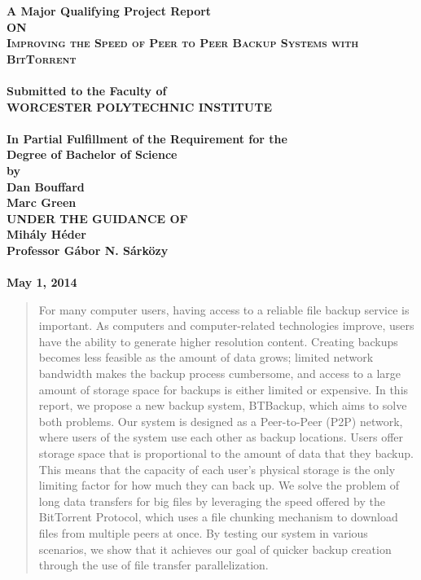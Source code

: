 \documentclass[12pt]{report}
\begin{document}
\begin{titlepage}
\begin{center}
\thispagestyle{empty}
\Large{\textbf{A Major Qualifying Project Report\\ \large{ON}}}\\[1.75cm]
\LARGE{\textsc {\textbf{Improving the Speed of Peer to Peer Backup Systems with BitTorrent}}}\\[0.5cm]
\vspace{0.25cm}
\Large{\textbf{\\Submitted to the Faculty of }}
\LARGE{\textbf{\\WORCESTER POLYTECHNIC INSTITUTE\\}}
\vspace{0.5cm}
\Large{\textbf{\\In Partial Fulfillment of the Requirement for the}}
\Large{\textbf{\\Degree of Bachelor of Science}}
\vspace{0.5cm}
\Large{\textbf{\\by}}\\[0.75cm]
\large{\textbf{Dan Bouffard}}\\
\large{\textbf{Marc Green}}\\
\vspace{1cm}
\large{\textbf{UNDER THE GUIDANCE OF}}\\
\vspace{.25cm}
\large{\textbf{Mih\'aly H\'eder}}\\
\large{\textbf{Professor G\'abor N. S\'ark\"ozy}}\\
\vspace{1cm}
\large{\textbf{\\May 1, 2014}}\\
\end{center}
\end{titlepage}

\begin{abstract}
For many computer users, having access to a reliable file backup service is important. As computers and computer-related technologies improve, users have the ability to generate higher resolution content. Creating backups becomes less feasible as the amount of data grows; limited network bandwidth makes the backup process cumbersome, and access to a large amount of storage space for backups is either limited or expensive. In this report, we propose a new backup system, BTBackup, which aims to solve both problems. Our system is designed as a Peer-to-Peer (P2P) network, where users of the system use each other as backup locations. Users offer storage space that is proportional to the amount of data that they backup. This means that the capacity of each user's physical storage is the only limiting factor for how much they can back up. We solve the problem of long data transfers for big files by leveraging the speed offered by the BitTorrent Protocol, which uses a file chunking mechanism to download files from multiple peers at once. By testing our system in various scenarios, we show that it achieves our goal of quicker backup creation through the use of file transfer parallelization.
\end{abstract}
\end{document}
